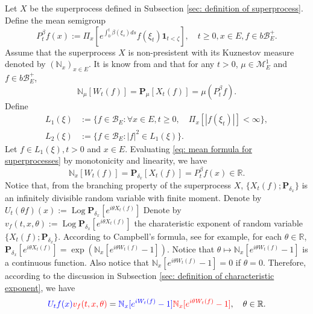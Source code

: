 \documentclass[12pt,oneside,english]{amsart}
\theoremstyle{plain}
\theoremstyle{definition}
\numberwithin{equation}{section}
\newcommand{\added}[1]{{\color{blue}#1}}\newcommand{\deleted}[1]{{\color{red}#1}}
\begin{document}
\subsection{}
\label{sec: definition of vf}
    Let $X$ be the superprocess defined in Subsection \ref{sec: definition of superprocess}.
    Define the mean semigroup
\begin{equation}
    P_t^\beta f(x)
    := \Pi_{x}[e^{\int_0^t \beta(\xi_s)ds}f(\xi_t) \mathbf 1_{t< \zeta}],
    \quad t\geq 0, x\in E, f\in b\mathscr B^+_E.
\end{equation}
    Assume that the superprocess $X$ is non-presistent with its Kuznestov measure denoted by $(\mathbb N_x)_{x\in E}$.
    It is know from \cite[Proposition 2.27]{Li2011Measure-valued} and \cite[Theorem 2.7]{Kyprianou2014Fluctuations} that for any $t > 0$, $\mu \in \mathcal M_E^1$ and $f\in b\mathscr B^+_E$,
\begin{equation}
\label{eq: mean formula for superprocesses}
    \mathbb N_{\mu}[W_t(f)]
    =\mathbf P_{\mu}[X_t(f)]=\mu(P^\beta_t f).
\end{equation}
    Define
\begin{align}
    L_1(\xi)
    &:= \{f\in \mathscr B_E: \forall x\in E, t\geq 0, \quad \Pi_x[|f(\xi_t)|]< \infty\},
    \\L_2(\xi)
    &:= \{f \in \mathscr B_E: |f|^2 \in L_1(\xi)\}.
\end{align}
    Let $f\in L_1(\xi), t >0$ and $x\in E$.
    Evaluating \eqref{eq: mean formula for superprocesses} by monotonicity and linearity, we have
\begin{equation}
    \mathbb N_x[W_t(f)]
    =\mathbf P_{\delta_x}[X_t(f)]=P^\beta_t f(x) \in \mathbb R.
\end{equation}
    Notice that, from the branching property of the superprocess $X$, $\{X_t(f); \mathbf P_{\delta_x}\}$ is an infinitely divisible random variable with finite moment.
    \added{ Denote by $U_t(\theta f)(x) := \operatorname{Log} \mathbf P_{\delta_x}[e^{i \theta X_t(f)}]$ }\deleted{ Denote by $v_f(t,x,\theta) := \operatorname{Log} \mathbf P_{\delta_x}[e^{i\theta X_t(f)}]$} the charateristic exponent of random variable $\{X_t(f); \mathbf P_{\delta_x}\}$.
    According to Campbell's formula, see \cite[Theorem 2.7]{Kyprianou2014Fluctuations} for example, for each $\theta \in \mathbb R$,
$   \mathbf P_{\delta_x} [e^{i\theta X_t(f)}]
    = \exp(\mathbb N_x[ e^{i\theta W_t(f)} - 1]).
$
    Notice that $\theta \mapsto \mathbb N_x[e^{i\theta W_t(f)} - 1]$ is a continuous function.
    Also notice that $\mathbb N_x[e^{i\theta W_t(f)} - 1] = 0$ if $\theta = 0$.
    Therefore, according to the discussion in Subsection \ref{sec: definition of characteristic exponent}, we have
\begin{equation}
\label{eq: N and characteristic exponent}
    \added{ U_tf(x)}\deleted{ v_f(t,x,\theta)} = \added{ \mathbb N_x[e^{i W_t(f)} - 1]}
    \deleted{ \mathbb N_x[e^{i\theta W_t(f)} - 1]},
    \quad \theta \in \mathbb R.
\end{equation}
\end{document}
